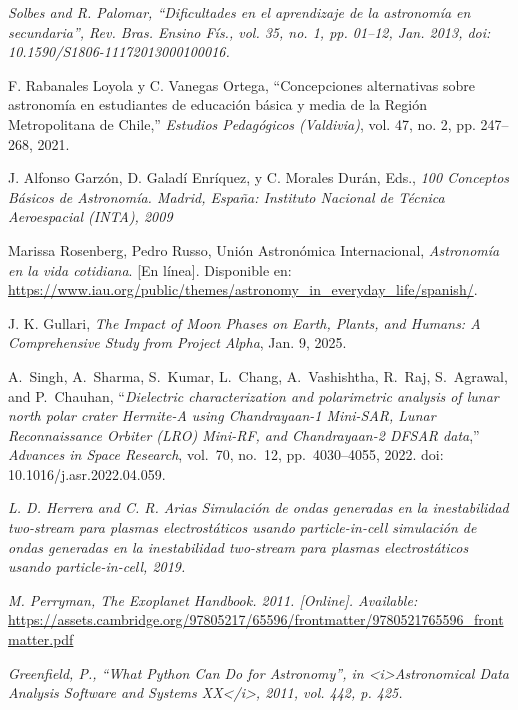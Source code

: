 \begin{thebibliography}{99}
 \textit{Solbes and R. Palomar, “Dificultades en el aprendizaje de la astronomía en secundaria”, Rev. Bras. Ensino Fís., vol. 35, no. 1, pp. 01–12, Jan. 2013, doi: 10.1590/S1806-11172013000100016.}

 F. Rabanales Loyola y C. Vanegas Ortega, 
``Concepciones alternativas sobre astronomía en estudiantes de educación básica y media de la Región Metropolitana de Chile,'' 
\textit{Estudios Pedagógicos (Valdivia)}, vol. 47, no. 2, pp. 247–268, 2021.

 J. Alfonso Garzón, D. Galadí Enríquez, y C. Morales Durán, Eds., \textit{100 Conceptos Básicos de Astronomía. Madrid, España: Instituto Nacional de Técnica Aeroespacial (INTA), 2009}

 Marissa Rosenberg, Pedro Russo, Unión Astronómica Internacional, 
\textit{Astronomía en la vida cotidiana}. [En línea]. Disponible en: \href{https://www.iau.org/public/themes/astronomy_in_everyday_life/spanish/}{https://www.iau.org/public/themes/astronomy\_in\_everyday\_life/spanish/}.

 J. K. Gullari, 
\textit{The Impact of Moon Phases on Earth, Plants, and Humans: A Comprehensive Study from Project Alpha}, 
Jan. 9, 2025.

A.~Singh, A.~Sharma, S.~Kumar, L.~Chang, A.~Vashishtha, R.~Raj, S.~Agrawal, and P.~Chauhan, ``\textit{Dielectric characterization and polarimetric analysis of lunar north polar crater Hermite-A using Chandrayaan-1 Mini-SAR, Lunar Reconnaissance Orbiter (LRO) Mini-RF, and Chandrayaan-2 DFSAR data},'' \textit{Advances in Space Research}, vol.~70, no.~12, pp.~4030--4055, 2022. doi: 10.1016/j.asr.2022.04.059.


 \textit{L. D. Herrera and C. R. Arias Simulación de ondas generadas en la inestabilidad two-stream para
plasmas electrostáticos usando particle-in-cell simulación de ondas generadas en la inestabilidad
two-stream para plasmas electrostáticos usando particle-in-cell, 2019.}

\textit{M. Perryman, The Exoplanet Handbook. 2011. [Online]. Available: } \url{https://assets.cambridge.org/97805217/65596/frontmatter/9780521765596_frontmatter.pdf}


 \textit{Greenfield, P., “What Python Can Do for Astronomy”, in <i>Astronomical Data Analysis Software and Systems XX</i>, 2011, vol. 442, p. 425.}


\end{thebibliography}
